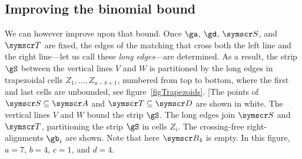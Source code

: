 \documentclass[10pt, a4paper, twoside]{basestyle}
\newcommand{\pointset}{\symscr}
\begin{document}
\subsection{Improving the binomial bound}
We can however improve upon that bound. Once $\ga$, $\gd$, $\pointset S$, and $\pointset T$
are fixed, the edges of the matching that cross both the left line
and the right line---let us call these \emph{long edges}---are determined.
As a result,
the strip $\gS$ between the vertical lines $V$ and $W$ is partitioned by the long edges in trapezoidal cells
$Z_1,\dotsc,Z_{a-b+1}$, numbered from top to bottom, where the first and last cells are
unbounded, see figure~\ref{figTrapezoids}.
\marginfig[The points of $\pointset S\Subset \pointset A$ and
$\pointset T\Subset \pointset D$ are shown in white.
The vertical lines $V$ and $W$ bound the strip $\gS$.
The long edges join $\pointset S$ and
$\pointset T$, partitioning the strip $\gS$ in cells $Z_i$.
The crossing-free right-alignments $\gb_i$ are shown.
Note that here $\pointset B_4$ is empty.
In this figure, $a=7$, $b=4$, $c=1$, and $d=4$.
\end{document}
